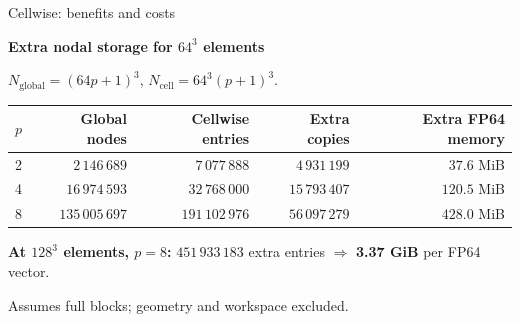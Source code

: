 \documentclass[aspectratio=169,11pt]{beamer}
\begin{document}
\begin{frame}{Cellwise: benefits and costs}
  \vspace{0.05cm}
  {\large\bfseries Extra nodal storage for $64^3$ elements\par}
  \vspace{0.06cm}
  {\small $N_{\mathrm{global}}=(64p+1)^3$,\quad
          $N_{\mathrm{cell}}=64^3(p+1)^3$.\par}
  \vspace{0.02cm}
  \begin{center}
    {\small
    \begin{tabular}{c r r r r}
      \hline
      $p$ & Global nodes & Cellwise entries & Extra copies & Extra FP64 memory \\
      \hline
      2 & $2\,146\,689$ & $7\,077\,888$ & $4\,931\,199$ & $37.6$ MiB \\
      4 & $16\,974\,593$ & $32\,768\,000$ & $15\,793\,407$ & $120.5$ MiB \\
      8 & $135\,005\,697$ & $191\,102\,976$ & $56\,097\,279$ & $428.0$ MiB \\
      \hline
    \end{tabular}}
  \end{center}
  \vspace{-0.16cm}
  {\small\color{orange}\textbf{At $128^3$ elements, $p=8$:}
   $451\,933\,183$ extra entries $\Rightarrow$ \textbf{3.37 GiB} per FP64 vector.\par}
  \vspace{0.05cm}
  {\scriptsize\color{muted}Assumes full blocks; geometry and workspace excluded.\par}
\end{frame}
\end{document}
